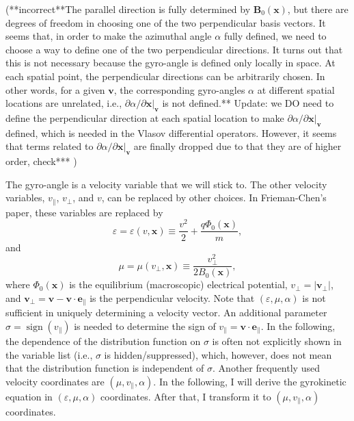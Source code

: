 \documentclass{article}
\newcommand{\nobracket}{}
\newcommand{\tmop}[1]{\ensuremath{\operatorname{#1}}}
\begin{document}
(**incorrect**The parallel direction is fully determined by $\mathbf{B}_0
(\mathbf{x})$, but there are degrees of freedom in choosing one of the two
perpendicular basis vectors. It seems that, in order to make the azimuthal
angle $\alpha$ fully defined, we need to choose a way to define one of the two
perpendicular directions. It turns out that this is not necessary because the
gyro-angle is defined only locally in space. At each spatial point, the
perpendicular directions can be arbitrarily chosen. In other words, for a
given $\mathbf{v}$, the corresponding gyro-angles $\alpha$ at different
spatial locations are unrelated, i.e., $\partial \alpha / \partial \mathbf{x}
|_{\mathbf{v}} \nobracket$ is not defined.** Update: we DO need to define the
perpendicular direction at each spatial location to make $\partial \alpha /
\partial \mathbf{x} |_{\mathbf{v}} \nobracket$ defined, which is needed in the
Vlasov differential operators. However, it seems that terms related to
$\partial \alpha / \partial \mathbf{x} |_{\mathbf{v}} \nobracket$ are finally
dropped due to that they are of higher order, check*** )

The gyro-angle is a velocity variable that we will stick to. The other
velocity variables, $v_{\parallel}$, $v_{\perp}$, and $v$, can be replaced by
other choices. In Frieman-Chen's paper, these variables are replaced by
\begin{equation}
  \varepsilon = \varepsilon (v, \mathbf{x}) \equiv \frac{v^2}{2} + \frac{q
  \Phi_0 (\mathbf{x})}{m},
\end{equation}
and
\begin{equation}
  \mu = \mu (v_{\perp}, \mathbf{x}) \equiv \frac{v_{\perp}^2}{2 B_0
  (\mathbf{x})},
\end{equation}
where $\Phi_0 (\mathbf{x})$ is the equilibrium (macroscopic) electrical
potential, $v_{\perp} = | \mathbf{v}_{\perp} |$, and $\mathbf{v}_{\perp}
=\mathbf{v}-\mathbf{v} \cdot \mathbf{e}_{\parallel}$ is the perpendicular
velocity. Note that $(\varepsilon, \mu, \alpha)$ is not sufficient in uniquely
determining a velocity vector. An additional parameter $\sigma = \tmop{sign}
(v_{\parallel})$ is needed to determine the sign of $v_{\parallel} =\mathbf{v}
\cdot \mathbf{e}_{\parallel}$. In the following, the dependence of the
distribution function on $\sigma$ is often not explicitly shown in the
variable list (i.e., $\sigma$ is hidden/suppressed), which, however, does not
mean that the distribution function is independent of $\sigma$. Another
frequently used velocity coordinates are $(\mu, v_{\parallel}, \alpha)$. In
the following, I will derive the gyrokinetic equation in $(\varepsilon, \mu,
\alpha)$ coordinates. After that, I transform it to $(\mu, v_{\parallel},
\alpha)$ coordinates.
\end{document}
